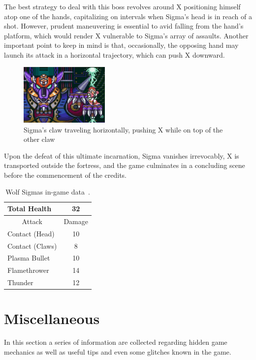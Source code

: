 The best strategy to deal with this boss  revolves around X positioning himself atop one of the hands, capitalizing on intervals when  Sigma's head is in reach of a shot. However, prudent maneuvering is essential to avid falling from the hand's platform, which would render X vulnerable to Sigma's array of assaults. Another important point to keep in mind is that, occasionally, the opposing hand may launch its attack in a horizontal trajectory, which can push X downward.
\begin{figure}[htp]
	\centering
	\includegraphics[height=3cm]{figures/X1/Sigma_stages/WolfSigma_claw_2.jpg}
	\caption{Sigma's claw traveling horizontally, pushing X while on top of the other claw}
\end{figure}
Upon the defeat of this ultimate incarnation, Sigma vanishes irrevocably, X is transported outside the fortress, and the game culminates in a concluding scene before the commencement of the credits.

\begin{table}[htp]
	\centering
	\begin{tabular}[h]{l c}
		\toprule
		Total Health  & 32\\
		\midrule
		\multicolumn{1}{c}{Attack} & \multicolumn{1}{c}{Damage}\\
		Contact (Head) & 10\\
		Contact (Claws) & 8\\
		Plasma Bullet & 10\\
		Flamethrower & 14\\
		Thunder & 12\\
		\bottomrule
	\end{tabular}
	\caption{Wolf Sigmas in-game data~\cite{wiki:Sigma}.}
\end{table}

\section{Miscellaneous}\label{X1:misc} %
In this section a series of information are collected regarding hidden game mechanics as well as useful tips and even some glitches known in the game.

